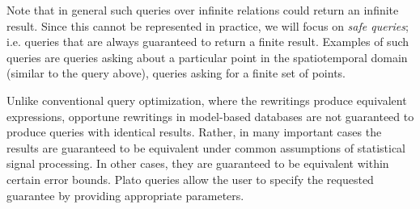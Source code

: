 Note that in general such queries over infinite relations could return an infinite result. Since this cannot be represented in practice, we will focus on {\em safe queries}; i.e. queries that are always guaranteed to return a finite result. Examples of such queries are queries asking about a particular point in the spatiotemporal domain (similar to the query above), queries asking for a finite set of points. 

Unlike conventional query optimization, where the rewritings produce equivalent expressions, opportune rewritings in model-based databases are not guaranteed to produce queries with identical results. Rather, in many important cases the results are guaranteed to be equivalent under common assumptions of statistical signal processing. In other cases, they are guaranteed to be equivalent within certain error bounds. Plato queries allow the user to specify the requested guarantee by providing appropriate parameters.



